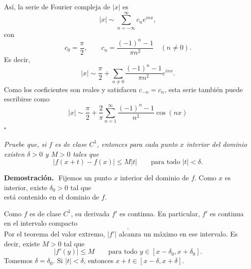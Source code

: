 \documentclass[11pt,letterpaper]{article}
\begin{document}
Así, la serie de Fourier compleja de $|x|$ es
\begin{equation*}
    |x|\sim \sum_{n=-\infty}^{\infty}c_ne^{inx},
\end{equation*}
con
\begin{equation*}
    c_0=\frac{\pi}{2},
    \qquad
    c_n=\frac{(-1)^n-1}{\pi n^2}\quad (n\neq 0).
\end{equation*}
Es decir,
\begin{equation*}
    |x|\sim \frac{\pi}{2}+\sum_{n\neq 0}\frac{(-1)^n-1}{\pi n^2}e^{inx}.
\end{equation*}
Como los coeficientes son reales y satisfacen $c_{-n}=c_n$, esta serie también puede escribirse como
\begin{equation*}
    |x|\sim \frac{\pi}{2}+\frac{2}{\pi}\sum_{n=1}^{\infty}\frac{(-1)^n-1}{n^2}\cos(nx)
\end{equation*}
\hfill $\square$
\vspace{0.4cm}
\begin{tcolorbox}[title=\textcolor{white}{Problema 7}]
\textit{Pruebe que, si $f$ es de clase $C^1$, entonces para cada punto $x$ interior del dominio existen $\delta>0$ y $M>0$ tales que}
\begin{equation*}
    |f(x+t)-f(x)|\leq M|t|
    \qquad\text{para todo } |t|<\delta.
\end{equation*}
\end{tcolorbox}

\textbf{Demostración.}\,\
Fijemos un punto $x$ interior del dominio de $f$. Como $x$ es interior, existe $\delta_0>0$ tal que
\begin{equation*}
    [x-\delta_0,x+\delta_0]
\end{equation*}
está contenido en el dominio de $f$.

Como $f$ es de clase $C^1$, su derivada $f'$ es continua. En particular, $f'$ es continua en el intervalo compacto
\begin{equation*}
    [x-\delta_0,x+\delta_0].
\end{equation*}
Por el teorema del valor extremo, $|f'|$ alcanza un máximo en ese intervalo. Es decir, existe $M>0$ tal que
\begin{equation*}
    |f'(y)|\leq M
    \qquad\text{para todo }y\in[x-\delta_0,x+\delta_0].
\end{equation*}
Tomemos $\delta=\delta_0$. Si $|t|<\delta$, entonces $x+t\in[x-\delta,x+\delta]$.
\end{document}
